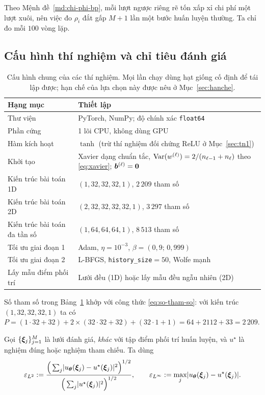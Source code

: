 Theo Mệnh đề~\ref{md:chi-phi-bp}, mỗi lượt ngược riêng rẽ tốn xấp xỉ chi phí một
lượt xuôi, nên việc đo $\rho_i$ đắt gấp $M+1$ lần một bước huấn luyện thường. Ta
chỉ đo mỗi $100$ vòng lặp.
 
\subsection{Cấu hình thí nghiệm và chỉ tiêu đánh giá}
\label{ssec:cauhinh}
 
\begin{table}[H]
\centering
\caption{Cấu hình chung của các thí nghiệm. Mọi lần chạy dùng hạt giống cố định
để tái lập được; hạn chế của lựa chọn này được nêu ở Mục~\ref{sec:hanche}.}
\label{tab:cauhinh}
\small
\begin{tabular}{@{}p{4.3cm}p{9.2cm}@{}}
\toprule
\textbf{Hạng mục} & \textbf{Thiết lập} \\
\midrule
Thư viện & PyTorch, NumPy; độ chính xác \texttt{float64} \\
Phần cứng & 1 lõi CPU, không dùng GPU \\
Hàm kích hoạt & $\tanh$ (trừ thí nghiệm đối chứng ReLU ở Mục~\ref{sec:tn1}) \\
Khởi tạo & Xavier dạng chuẩn tắc, $\operatorname{Var}(w^{(\ell)}) = 2/(n_{\ell-1}+n_{\ell})$
  theo \eqref{eq:xavier}; $\bm{b}^{(\ell)} = \bm{0}$ \\
Kiến trúc bài toán 1D & $(1,32,32,32,1)$, $2\,209$ tham số \\
Kiến trúc bài toán 2D & $(2,32,32,32,32,1)$, $3\,297$ tham số \\
Kiến trúc bài toán đa tần số & $(1,64,64,64,1)$, $8\,513$ tham số \\
Tối ưu giai đoạn 1 & Adam, $\eta = 10^{-3}$, $\beta = (0{,}9;\,0{,}999)$ \\
Tối ưu giai đoạn 2 & L-BFGS, \texttt{history\_size}${}=50$, Wolfe mạnh \\
Lấy mẫu điểm phối trí & Lưới đều (1D) hoặc lấy mẫu đều ngẫu nhiên (2D) \\
\bottomrule
\end{tabular}
\end{table}
 
Số tham số trong Bảng~\ref{tab:cauhinh} khớp với công thức \eqref{eq:so-tham-so}:
với kiến trúc $(1,32,32,32,1)$ ta có
$P = (1\cdot32+32) + 2\times(32\cdot32+32) + (32\cdot1+1) = 64 + 2112 + 33
= 2\,209$.
 
\begin{definition}
\label{dn:chi-tieu}
Gọi $\{\bm{\xi}_j\}_{j=1}^{M}$ là lưới đánh giá, \emph{khác} với tập điểm phối trí
huấn luyện, và $u^{\star}$ là nghiệm đúng hoặc nghiệm tham chiếu. Ta dùng
\begin{equation}
\varepsilon_{L^2}
 := \frac{\Big(\sum_{j}\lvert u_{\bm{\theta}}(\bm{\xi}_j)
      - u^{\star}(\bm{\xi}_j)\rvert^2\Big)^{1/2}}
         {\Big(\sum_{j}\lvert u^{\star}(\bm{\xi}_j)\rvert^2\Big)^{1/2}},
\qquad
\varepsilon_{L^{\infty}}
 := \max_{j}\lvert u_{\bm{\theta}}(\bm{\xi}_j) - u^{\star}(\bm{\xi}_j)\rvert.
\label{eq:chi-tieu}
\end{equation}
\end{definition}
 
